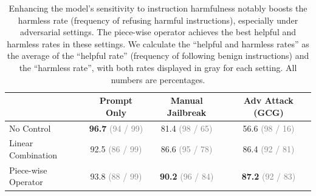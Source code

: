 


\begin{table}[t]

\centering
\begin{tabular}{lccc}
\toprule
& Prompt Only & Manual Jailbreak & Adv Attack (GCG) \\\midrule
No Control & \textbf{96.7} \textcolor{gray}{(94 / 99)} & 81.4 \textcolor{gray}{(98 / 65)} & 56.6 \textcolor{gray}{(98 / 16)}\\

Linear Combination & 92.5 \textcolor{gray}{(86 / 99)} & 86.6 \textcolor{gray}{(95 / 78)} & 86.4 \textcolor{gray}{(92 / 81)} \\

Piece-wise Operator & 93.8 \textcolor{gray}{(88 / 99)} & \textbf{90.2} \textcolor{gray}{(96 / 84)} & \textbf{87.2} \textcolor{gray}{(92 / 83)} \\\bottomrule
\end{tabular}
\caption{Enhancing the model's sensitivity to instruction harmfulness notably boosts the harmless rate (frequency of refusing harmful instructions), especially under adversarial settings. The piece-wise operator achieves the best helpful and harmless rates in these settings. We calculate the ``helpful and harmless rates'' as the average of the ``helpful rate'' (frequency of following benign instructions) and the ``harmless rate'', with both rates displayed in gray for each setting. All numbers are percentages.}
\label{table:jailbreak}
\vspace{-5mm}
\end{table}
